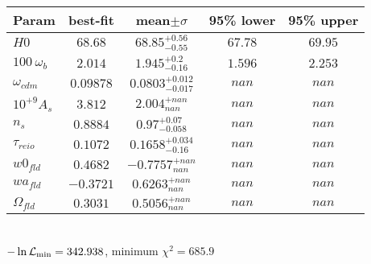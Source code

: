 \begin{tabular}{|l|c|c|c|c|} 
 \hline 
Param & best-fit & mean$\pm\sigma$ & 95\% lower & 95\% upper \\ \hline 
$H0$ &$68.68$ & $68.85_{-0.55}^{+0.56}$ & $67.78$ & $69.95$ \\ 
$100~\omega_{b }$ &$2.014$ & $1.945_{-0.16}^{+0.2}$ & $1.596$ & $2.253$ \\ 
$\omega_{cdm }$ &$0.09878$ & $0.0803_{-0.017}^{+0.012}$ & $nan$ & $nan$ \\ 
$10^{+9}A_{s }$ &$3.812$ & $2.004_{nan}^{+nan}$ & $nan$ & $nan$ \\ 
$n_{s }$ &$0.8884$ & $0.97_{-0.058}^{+0.07}$ & $nan$ & $nan$ \\ 
$\tau_{reio }$ &$0.1072$ & $0.1658_{-0.16}^{+0.034}$ & $nan$ & $nan$ \\ 
$w0_{fld }$ &$0.4682$ & $-0.7757_{nan}^{+nan}$ & $nan$ & $nan$ \\ 
$wa_{fld }$ &$-0.3721$ & $0.6263_{nan}^{+nan}$ & $nan$ & $nan$ \\ 
$\Omega_{fld }$ &$0.3031$ & $0.5056_{nan}^{+nan}$ & $nan$ & $nan$ \\ 
\hline 
 \end{tabular} \\ 
$-\ln{\cal L}_\mathrm{min} =342.938$, minimum $\chi^2=685.9$ \\ 
